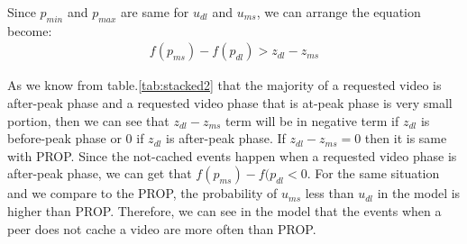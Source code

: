 \documentclass[10pt,final,journal,a4paper]{IEEEtran}
\begin{document}
Since $p_{min}$ and $p_{max}$ are same for $u_{dl}$ and $u_{ms}$, we can arrange the equation become:
\begin{align}\label{eq:dlms_4}
f(p_{ms}) - f(p_{dl}) > z_{dl} - z_{ms}
\end{align}


As we know from table.\ref{tab:stacked2} that the majority of a requested video is after-peak phase and a requested video phase that is  at-peak phase is very small portion, then we can see that $z_{dl} - z_{ms}$ term will be in negative term if $z_{dl}$ is  before-peak phase or $0$ if $z_{dl}$ is  after-peak phase. 
If $z_{dl} - z_{ms}=0$ then it is same with PROP. 
Since the not-cached events happen when a requested video phase is after-peak phase, we can get that $f(p_{ms}) - f(p_{dl} < 0$.
For the same situation and we compare to the PROP, the probability of $u_{ms}$ less than $u_{dl}$ in the model is higher than PROP. 
Therefore, we can see in the model that the events when a peer does not cache a video are more often than PROP.


\end{document}
